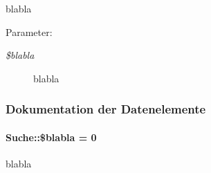 blabla 

\begin{Desc}
\item[Parameter:]
\begin{description}
\item[{\em \$blabla}]blabla \end{description}
\end{Desc}


\subsubsection{Dokumentation der Datenelemente}
\hypertarget{classSuche_4c132138ff7a8f08e3b9fddb540254bb}{
\paragraph[\$blabla]{\setlength{\rightskip}{0pt plus 5cm}Suche::\$blabla = 0}\hfill}
\label{classSuche_4c132138ff7a8f08e3b9fddb540254bb}


blabla 

